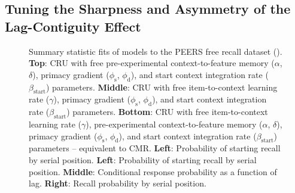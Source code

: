 \documentclass[
  man,
  floatsintext,
  longtable,
  nolmodern,
  notxfonts,
  notimes,
  draftfirst,
  colorlinks=true,linkcolor=blue,citecolor=blue,urlcolor=blue]{apa7}
\begin{document}
\subsection{Tuning the Sharpness and Asymmetry of the Lag-Contiguity
Effect}\label{tuning-the-sharpness-and-asymmetry-of-the-lag-contiguity-effect}

\begin{figure}

\caption{\label{fig-fitlagcrp}Summary statistic fits of models to the
PEERS free recall dataset (). \textbf{Top}: CRU with free pre-experimental
context-to-feature memory (\(\alpha\), \(\delta\)), primacy gradient
(\(\phi_\text{s}\), \(\phi_\text{d}\)), and start context integration
rate (\(\beta_\text{start}\)) parameters. \textbf{Middle}: CRU with free
item-to-context learning rate (\(\gamma\)), primacy gradient
(\(\phi_\text{s}\), \(\phi_\text{d}\)), and start context integration
rate (\(\beta_\text{start}\)) parameters. \textbf{Bottom}: CRU with free
item-to-context learning rate (\(\gamma\)), pre-experimental
context-to-feature memory (\(\alpha\), \(\delta\)), primacy gradient
(\(\phi_\text{s}\), \(\phi_\text{d}\)), and start context integration
rate (\(\beta_\text{start}\)) parameters -- equivalent to CMR.
\textbf{Left}: Probability of starting recall by serial position.
\textbf{Left}: Probability of starting recall by serial position.
\textbf{Middle}: Conditional response probability as a function of lag.
\textbf{Right}: Recall probability by serial position.}


\end{figure}
\end{document}
